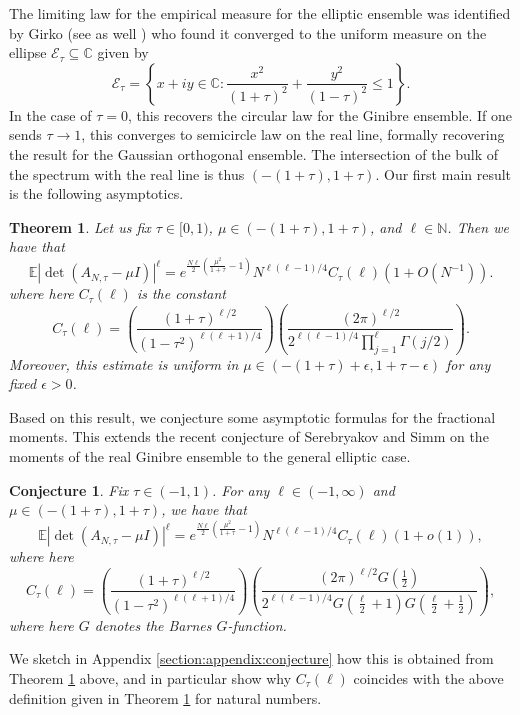 \documentclass[12pt]{article}
\newcommand{\N}{\mathbb{N}}
\newcommand{\C}{\mathbb{C}}
\newcommand{\E}{\mathbb{E}}
\newtheorem{theorem}[info]{Theorem}
\newtheorem{conjecture}[info]{Conjecture}
\numberwithin{info}{section}
\numberwithin{equation}{section}
\renewcommand{\[}{\begin{equation}}
\renewcommand{\]}{\end{equation}}
\renewcommand{\cal}{\mathcal}
\newcommand{\<}{\langle}
\renewcommand{\>}{\rangle}
\renewcommand{\l}{\left}
\renewcommand{\r}{\right}
\begin{document}
	The limiting law for the empirical measure for the elliptic ensemble was identified by Girko \cite{girko1} (see as well \cite{naumov}) who found it converged to the uniform measure on the ellipse $\cal{E}_\tau\subseteq \C$ given by
	\[\cal{E}_\tau=\left\{x+iy\in \C:\frac{x^2}{(1+\tau)^2}+\frac{y^2}{(1-\tau)^2}\le 1\right\}.\label{eqn:ellipse}\]
	In the case of $\tau=0$, this recovers the circular law for the Ginibre ensemble. If one sends $\tau \to 1$, this converges to semicircle law on the real line, formally recovering the result for the Gaussian orthogonal ensemble. The intersection of the bulk of the spectrum with the real line is thus $(-(1+\tau),1+\tau)$. Our first main result is the following asymptotics.
	
	\begin{theorem}
		\label{theorem: moments of real bulk}
		Let us fix $\tau\in [0,1)$, $\mu\in (-(1+\tau),1+\tau)$, and $\ell \in \N$. Then we have that
		\[
		\E|\det(A_{N,\tau}-\mu I)|^{\ell}=e^{\frac{N \ell}{2} \left(\frac{\mu^2}{1+\tau}-1\right)}N^{\ell(\ell-1)/4}C_{\tau}(\ell)\l(1+O\l(N^{-1}\r)\r).
		\]
		where here $C_{\tau}(\ell)$ is the constant
		\[C_{\tau}(\ell)=\left(\frac{(1+\tau)^{\ell/2}}{(1-\tau^2)^{\ell(\ell+1)/4}}\right)\left(\frac{(2\pi)^{\ell/2}}{2^{\ell(\ell-1)/4}\prod_{j=1}^{\ell}\Gamma(j/2)}\right).\]
		\noindent
		Moreover, this estimate is uniform in $\mu \in (-(1+\tau)+\epsilon,1+\tau-\epsilon)$ for any fixed $\epsilon>0$.
	\end{theorem}
	
	Based on this result, we conjecture some asymptotic formulas for the fractional moments. This extends the recent conjecture of Serebryakov and Simm \cite{nickrecent} on the moments of the real Ginibre ensemble to the general elliptic case.
	
	\begin{conjecture}
		\label{conjecture: moment conjecture}
		Fix $\tau\in (-1,1)$. For any $\ell\in (-1,\infty)$ and $\mu \in (-(1+\tau),1+\tau)$, we have that
		\[
		\E|\det(A_{N,\tau}-\mu I)|^{\ell}=e^{\frac{N \ell}{2} \left(\frac{\mu^2}{1+\tau}-1\right)}N^{\ell(\ell-1)/4}C_{\tau}(\ell)(1+o(1)),
		\]
		where here
		\[C_{\tau}(\ell)=\left(\frac{(1+\tau)^{\ell/2}}{(1-\tau^2)^{\ell(\ell+1)/4}}\right)\left(\frac{(2\pi)^{\ell/2}G\l(\frac{1}{2}\r)}{2^{\ell(\ell-1)/4}G\l(\frac{\ell}{2}+1\r)G\l(\frac{\ell}{2}+\frac{1}{2}\r)}\right),\]
		where here $G$ denotes the Barnes $G$-function.
	\end{conjecture}
	
	We sketch in Appendix \ref{section:appendix:conjecture} how this is obtained from Theorem \ref{theorem: moments of real bulk} above, and in particular show why $C_{\tau}(\ell)$ coincides with the above definition given in Theorem \ref{theorem: moments of real bulk} for natural numbers.
	
\end{document}
